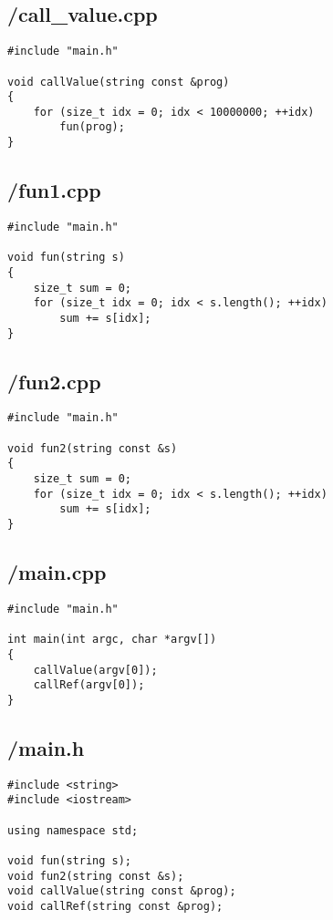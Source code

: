 \documentclass{article}
\begin{document}
\subsection*{/call\_value.cpp}
\begin{verbatim}
#include "main.h"

void callValue(string const &prog)
{
    for (size_t idx = 0; idx < 10000000; ++idx)
        fun(prog);
}
\end{verbatim}
\subsection*{/fun1.cpp}
\begin{verbatim}
#include "main.h"

void fun(string s)
{
    size_t sum = 0;
    for (size_t idx = 0; idx < s.length(); ++idx)
        sum += s[idx];
}

\end{verbatim}
\subsection*{/fun2.cpp}
\begin{verbatim}
#include "main.h"

void fun2(string const &s)
{
    size_t sum = 0;
    for (size_t idx = 0; idx < s.length(); ++idx)
        sum += s[idx];
}

\end{verbatim}
\subsection*{/main.cpp}
\begin{verbatim}
#include "main.h"

int main(int argc, char *argv[])
{
    callValue(argv[0]);
    callRef(argv[0]);
}
\end{verbatim}
\subsection*{/main.h}
\begin{verbatim}
#include <string>
#include <iostream>

using namespace std;

void fun(string s);
void fun2(string const &s);
void callValue(string const &prog);
void callRef(string const &prog);

\end{verbatim}
\end{document}
